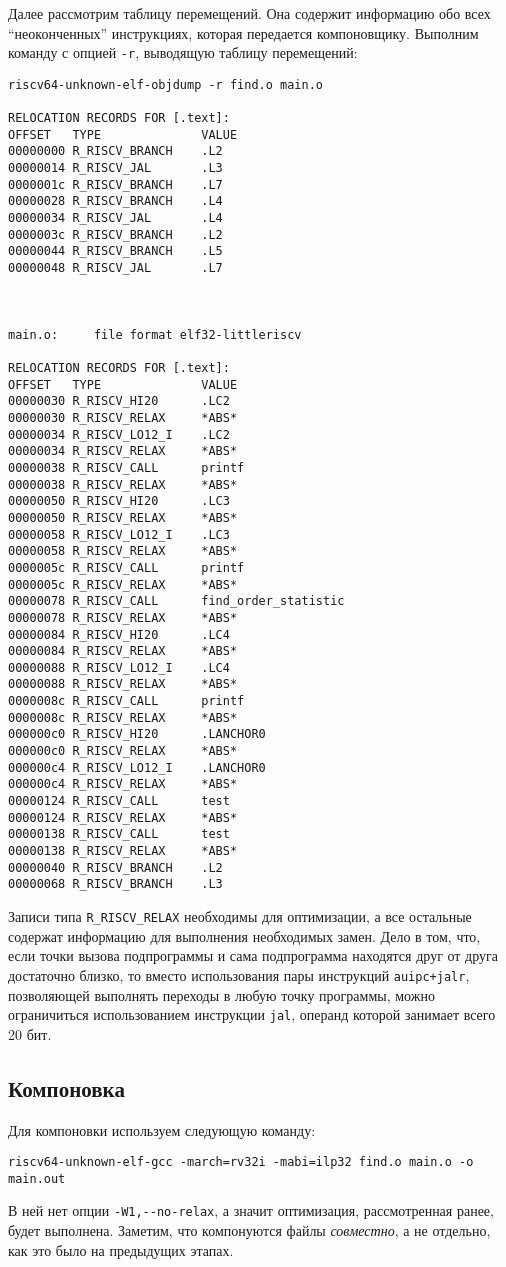    Далее рассмотрим таблицу перемещений. Она содержит информацию обо всех ``неоконченных'' инструкциях, которая передается компоновщику.
    Выполним команду с опцией \verb|-r|, выводящую таблицу перемещений:
    \begin{Verbatim}[breaklines=true]
riscv64-unknown-elf-objdump -r find.o main.o

RELOCATION RECORDS FOR [.text]:
OFFSET   TYPE              VALUE
00000000 R_RISCV_BRANCH    .L2
00000014 R_RISCV_JAL       .L3
0000001c R_RISCV_BRANCH    .L7
00000028 R_RISCV_BRANCH    .L4
00000034 R_RISCV_JAL       .L4
0000003c R_RISCV_BRANCH    .L2
00000044 R_RISCV_BRANCH    .L5
00000048 R_RISCV_JAL       .L7



main.o:     file format elf32-littleriscv

RELOCATION RECORDS FOR [.text]:
OFFSET   TYPE              VALUE
00000030 R_RISCV_HI20      .LC2
00000030 R_RISCV_RELAX     *ABS*
00000034 R_RISCV_LO12_I    .LC2
00000034 R_RISCV_RELAX     *ABS*
00000038 R_RISCV_CALL      printf
00000038 R_RISCV_RELAX     *ABS*
00000050 R_RISCV_HI20      .LC3
00000050 R_RISCV_RELAX     *ABS*
00000058 R_RISCV_LO12_I    .LC3
00000058 R_RISCV_RELAX     *ABS*
0000005c R_RISCV_CALL      printf
0000005c R_RISCV_RELAX     *ABS*
00000078 R_RISCV_CALL      find_order_statistic
00000078 R_RISCV_RELAX     *ABS*
00000084 R_RISCV_HI20      .LC4
00000084 R_RISCV_RELAX     *ABS*
00000088 R_RISCV_LO12_I    .LC4
00000088 R_RISCV_RELAX     *ABS*
0000008c R_RISCV_CALL      printf
0000008c R_RISCV_RELAX     *ABS*
000000c0 R_RISCV_HI20      .LANCHOR0
000000c0 R_RISCV_RELAX     *ABS*
000000c4 R_RISCV_LO12_I    .LANCHOR0
000000c4 R_RISCV_RELAX     *ABS*
00000124 R_RISCV_CALL      test
00000124 R_RISCV_RELAX     *ABS*
00000138 R_RISCV_CALL      test
00000138 R_RISCV_RELAX     *ABS*
00000040 R_RISCV_BRANCH    .L2
00000068 R_RISCV_BRANCH    .L3
    \end{Verbatim}
    Записи типа \verb|R_RISCV_RELAX| необходимы для оптимизации, а все остальные содержат информацию для выполнения необходимых замен.
    Дело в том, что, если точки вызова подпрограммы и сама подпрограмма находятся друг от друга достаточно близко, то вместо использования пары инструкций \verb|auipc+jalr|, позволяющей выполнять переходы в любую точку программы, можно ограничиться использованием инструкции \verb|jal|, операнд которой занимает всего 20 бит.
    \subsection{Компоновка}\label{subsec:linking}
    Для компоновки используем следующую команду:
    \begin{Verbatim}[breaklines=true]
riscv64-unknown-elf-gcc -march=rv32i -mabi=ilp32 find.o main.o -o main.out
    \end{Verbatim}
    В ней нет опции \verb|-W1,--no-relax|, а значит оптимизация, рассмотренная ранее, будет выполнена. Заметим, что компонуются файлы \textit{совместно}, а не отдельно, как это было на предыдущих этапах.

